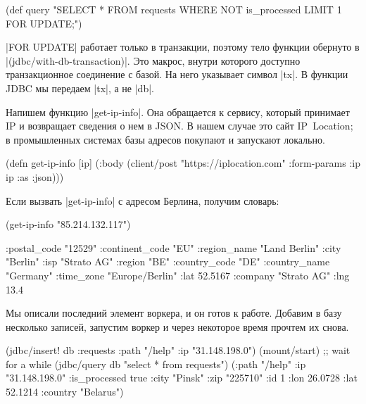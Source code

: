 \begin{english}
  \begin{clojure}
(def query
  "SELECT * FROM requests
   WHERE NOT is_processed
   LIMIT 1 FOR UPDATE;")
  \end{clojure}
\end{english}

\spverb|FOR UPDATE| работает только в транзакции, поэтому тело функции обернуто
в \spverb|(jdbc/with-db-transaction)|. Это макрос, внутри которого доступно
транзакционное соединение с базой. На него указывает символ \spverb|tx|. В
функции JDBC мы передаем \spverb|tx|, а не \spverb|db|.

Напишем функцию \spverb|get-ip-info|. Она обращается к сервису, который
принимает IP и возвращает сведения о нем в JSON. В нашем случае это сайт
IP~Location; в промышленных системах базы адресов покупают и запускают локально.

\begin{english}
  \begin{clojure}
(defn get-ip-info [ip]
  (:body (client/post "https://iplocation.com"
                      {:form-params {:ip ip}
                       :as :json})))
  \end{clojure}
\end{english}

Если вызвать \spverb|get-ip-info| с адресом Берлина, получим словарь:

\begin{english}
  \begin{clojure}
(get-ip-info "85.214.132.117")

{:postal_code "12529"
 :continent_code "EU"
 :region_name "Land Berlin"
 :city "Berlin"
 :isp "Strato AG"
 :region "BE"
 :country_code "DE"
 :country_name "Germany"
 :time_zone "Europe/Berlin"
 :lat 52.5167
 :company "Strato AG"
 :lng 13.4}
  \end{clojure}
\end{english}

Мы описали последний элемент воркера, и он готов к работе. Добавим в базу
несколько записей, запустим воркер и через некоторое время прочтем их снова.

\begin{english}
  \begin{clojure}
(jdbc/insert! db :requests {:path "/help" :ip "31.148.198.0"})
(mount/start)
;; wait for a while
(jdbc/query db "select * from requests")
({:path "/help" :ip "31.148.198.0" :is_processed true
  :city "Pinsk" :zip "225710" :id 1
  :lon 26.0728 :lat 52.1214 :country "Belarus"})
  \end{clojure}
\end{english}

